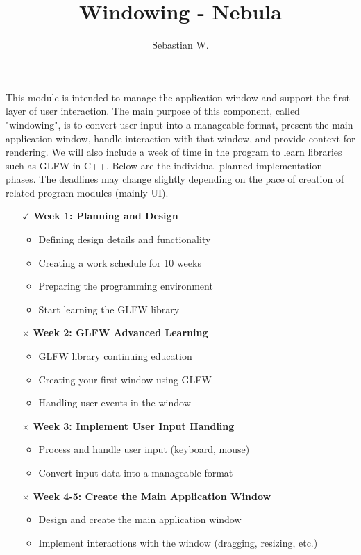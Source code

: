 \documentclass{article}
\title{Windowing - Nebula}
\author{Sebastian W.}
\begin{document}
\maketitle

This module is intended to manage the application window and support the first layer of user interaction. The main purpose of this component, called "windowing", is to convert user input into a manageable format, present the main application window, handle interaction with that window, and provide context for rendering. We will also include a week of time in the program to learn libraries such as GLFW in C++. Below are the individual planned implementation phases. The deadlines may change slightly depending on the pace of creation of related program modules (mainly UI).
\begin{itemize}

\item[$\checkmark$] \textbf{Week 1: Planning and Design}
    \begin{itemize}
        \item Defining design details and functionality
        \item Creating a work schedule for 10 weeks
        \item Preparing the programming environment
        \item Start learning the GLFW library
    \end{itemize}

\item[$\times$] \textbf{Week 2: GLFW Advanced Learning}
    \begin{itemize}
        \item GLFW library continuing education
        \item Creating your first window using GLFW
        \item Handling user events in the window
    \end{itemize}

\item[$\times$] \textbf{Week 3: Implement User Input Handling}
    \begin{itemize}
        \item Process and handle user input (keyboard, mouse)
        \item Convert input data into a manageable format
    \end{itemize}
    
    \item[$\times$] \textbf{Week 4-5: Create the Main Application Window}
    \begin{itemize}
        \item Design and create the main application window
        \item Implement interactions with the window (dragging, resizing, etc.)
    \end{itemize}
    

\end{itemize}
\end{document}
